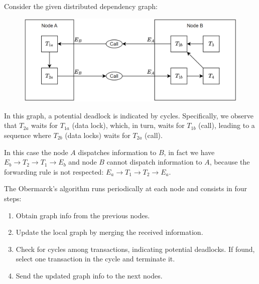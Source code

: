 \begin{example}
    Consider the given distributed dependency graph:
    \begin{figure}[H]
        \centering
        \includegraphics[width=0.5\linewidth]{images/distributedgraph.png}
    \end{figure}
    In this graph, a potential deadlock is indicated by cycles.
    Specifically, we observe that $T_{2a}$ waits for $T_{1a}$ (data lock), which, in turn, waits for $T_{1b}$ (call), leading to a sequence where $T_{2b}$ (data locks) waits for $T_{2a}$ (call).
    
    In this case the node $A$ dispatches information to $B$, in fact we have $ E_b \rightarrow T_2 \rightarrow T_1 \rightarrow E_b$ and node $B$ cannot dispatch information to $A$, because the forwarding rule is not respected: $E_a \rightarrow T_1 \rightarrow T_2 \rightarrow E_a$. 
\end{example}
The Obermarck's algorithm runs periodically at each node and consists in four steps: 
\begin{enumerate}
    \item Obtain graph info from the previous nodes.
    \item Update the local graph by merging the received information.
    \item Check for cycles among transactions, indicating potential deadlocks. 
        If found, select one transaction in the cycle and terminate it.
    \item Send the updated graph info to the next nodes.
\end{enumerate}
